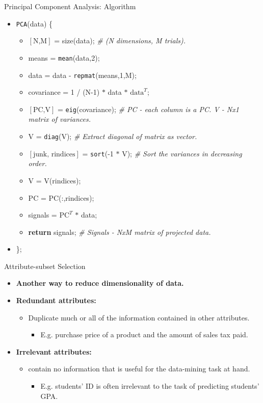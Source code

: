 \begin{frame}{Principal Component Analysis: Algorithm}
	\begin{itemize}
		\item \texttt{PCA}(data) \{
		\begin{itemize}
			\item $[\text{N,M}]$ = size(data); \emph{\color{gray}\# (N 
			dimensions, M trials).}
			\item means = \texttt{mean}(data,2);
			\item data = data - \texttt{repmat}(means,1,M);
			\item covariance = 1 / (N-1) $\ast$ data $\ast$ $\text{data}^T$;
			\item $[\text{PC,V}]$ = \texttt{eig}(covariance); 
			\emph{\color{gray}\# PC - each column is a PC. V - Nx1 matrix of 
			variances.}
			\item V = \texttt{diag}(V); \emph{\color{gray}\# Extract diagonal 
			of matrix as vector.}
			\item $[\text{junk, rindices}]$ = \texttt{sort}(-1 $\ast$ V); 
			\emph{\color{gray}\# Sort the variances in decreasing order.}
			\item V  = V(rindices);
			\item PC = PC(:,rindices);
			\item signals = $\text{PC}^T$ $\ast$ data;
			\item \textbf{return} signals; \emph{\color{gray}\# Signals - NxM 
			matrix of projected data.}
		\end{itemize}
		\item \};
	\end{itemize}
\end{frame}

\begin{frame}{Attribute-subset Selection}
	\begin{itemize}
		\item \textbf{Another way to reduce dimensionality of data.}
		\item\textbf{\color{airforceblue}Redundant attributes:}
		\begin{itemize}
			\item Duplicate much or all of the information contained in other 
			attributes.
			\begin{itemize}
				\item E.g. purchase price of a product and the amount of sales 
				tax paid.
			\end{itemize}
		\end{itemize}
		\item \textbf{\color{airforceblue}Irrelevant attributes:}
		\begin{itemize}
			\item contain no information that is useful for the data-mining 
			task at hand.
			\begin{itemize}
				\item E.g. students' ID is often irrelevant to the task of 
				predicting students' GPA.
			\end{itemize}
		\end{itemize}
	\end{itemize}
\end{frame}

